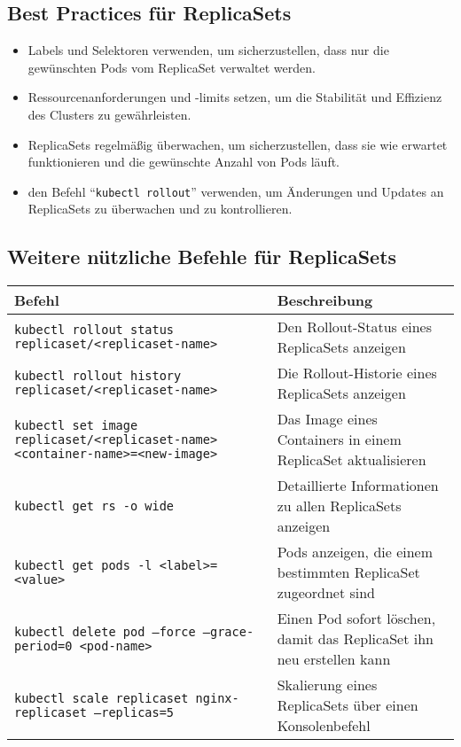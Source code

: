 \subsection{Best Practices für ReplicaSets}
\begin{itemize}
    \item Labels und Selektoren verwenden, um sicherzustellen, dass nur die gewünschten Pods vom ReplicaSet verwaltet werden.
    \item Ressourcenanforderungen und -limits setzen, um die Stabilität und Effizienz des Clusters zu gewährleisten.
    \item ReplicaSets regelmäßig überwachen, um sicherzustellen, dass sie wie erwartet funktionieren und die gewünschte Anzahl von Pods läuft.
    \item den Befehl \enquote{\texttt{kubectl rollout}} verwenden, um Änderungen und Updates an ReplicaSets zu überwachen und zu kontrollieren.
\end{itemize}

\subsection{Weitere nützliche Befehle für ReplicaSets}
\begin{tabular}{|p{}|p{}|}
\hline
\textbf{Befehl} & \textbf{Beschreibung} \\
\hline
\texttt{kubectl rollout status replicaset/<replicaset-name>} & Den Rollout-Status eines ReplicaSets anzeigen \\
\texttt{kubectl rollout history replicaset/<replicaset-name>} & Die Rollout-Historie eines ReplicaSets anzeigen \\
\texttt{kubectl set image replicaset/<replicaset-name> <container-name>=<new-image>} & Das Image eines Containers in einem ReplicaSet aktualisieren \\
\texttt{kubectl get rs -o wide} & Detaillierte Informationen zu allen ReplicaSets anzeigen \\
\texttt{kubectl get pods -l <label>=<value>} & Pods anzeigen, die einem bestimmten ReplicaSet zugeordnet sind \\
\texttt{kubectl delete pod --force --grace-period=0 <pod-name>} & Einen Pod sofort löschen, damit das ReplicaSet ihn neu erstellen kann \\
\texttt{kubectl scale replicaset nginx-replicaset --replicas=5} & Skalierung eines ReplicaSets über einen Konsolenbefehl\\
\hline
\end{tabular}
